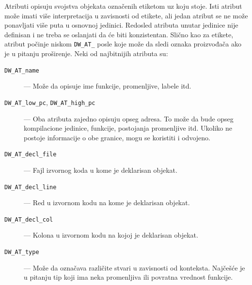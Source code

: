 \documentclass[12pt,oneside]{memoir}
\begin{document}
Atributi opisuju svojstva objekata označenih etiketom uz koju stoje.
Isti atribut može imati više interpretacija u zavisnosti od etikete, ali jedan atribut se ne može ponavljati više puta u osnovnoj jedinici.
Redosled atributa unutar jedinice nije definisan i ne treba se oslanjati da će biti konzistentan.
Slično kao za etikete, atribut počinje niskom \verb|DW_AT_| posle koje može da sledi oznaka proizvođača ako je u pitanju proširenje.
Neki od najbitnijih atributa su:
\begin{description}
  \item[\texttt{DW\_AT\_name}] --- Može da opisuje ime funkcije, promenljive, labele itd.
  \item[\texttt{DW\_AT\_low\_pc}, \texttt{DW\_AT\_high\_pc}] --- Oba atributa zajedno opisuju opseg adresa. To može da bude opseg kompilacione jedinice, funkcije, postojanja promenljive itd. Ukoliko ne postoje informacije o obe granice, mogu se koristiti i odvojeno.
  \item[\texttt{DW\_AT\_decl\_file}] --- Fajl izvornog koda u kome je deklarisan objekat.
  \item[\texttt{DW\_AT\_decl\_line}] --- Red u izvornom kodu na kome je deklarisan objekat.
  \item[\texttt{DW\_AT\_decl\_col}] --- Kolona u izvornom kodu na kojoj je deklarisan objekat.
  \item[\texttt{DW\_AT\_type}] --- Može da označava različite stvari u zavisnosti od konteksta. Najčešće je u pitanju tip koji ima neka promenljiva ili povratna vrednost funkcije. 
\end{description}

\end{document}
